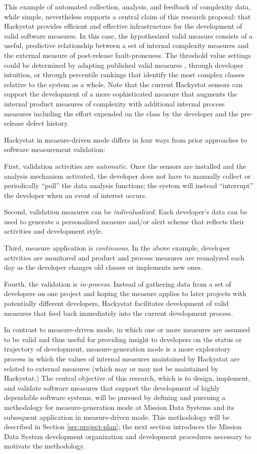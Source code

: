 This example of automated collection, analysis, and feedback of complexity
data, while simple, nevertheless supports a central claim of this research
proposal: that Hackystat provides efficient and effective infrastructure
for the development of valid software measures. In this case, the
hypothesized valid measure consists of a useful, predictive relationship
between a set of internal complexity measures and the external measure of
post-release fault-proneness. The threshold value settings could be
determined by adapting published valid measures \cite{Basili96,Briand01},
through developer intuition, or through percentile rankings that identify
the most complex classes relative to the system as a whole.  Note that the
current Hackystat sensors can support the development of a more
sophisticated measure that augments the internal product measures of
complexity with additional internal process measures including the effort
expended on the class by the developer and the pre-release defect history.

Hackystat in measure-driven mode differs in four ways from 
prior approaches to software measurement validation:

First, validation activities are {\em automatic}. Once the sensors are
installed and the analysis mechanism activated, the developer does not have
to manually collect or periodically ``poll'' the data analysis functions;
the system will instead ``interrupt'' the developer when an event of
interest occurs.

Second, validation measures can be {\em individualized}. Each developer's
data can be used to generate a personalized measure and/or alert scheme
that reflects their activities and development style.

Third, measure application is {\em continuous}. In the above example, 
developer activities are monitored and product and process measures are
reanalyzed each day as the developer changes old classes or implements new
ones.

Fourth, the validation is {\em in-process}.  Instead of gathering data from
a set of developers on one project and hoping the measure applies to later
projects with potentially different developers, Hackystat facilitates
development of valid measures that feed back immediately into the current
development process. 

In contrast to measure-driven mode, in which one or more measures are
assumed to be valid and thus useful for providing insight to developers on
the status or trajectory of development, measure-generation mode is a more
exploratory process in which the values of internal measures maintained by
Hackystat are related to external measures (which may or may not be
maintained by Hackystat.)   The central objective of this research, which is
to design, implement, and validate software measures that support the
development of highly dependable software systems, will be pursued by
defining and pursuing a methodology for measure-generation mode at Mission
Data Systems and its subsequent application in measure-driven
mode. This methodology will be described in Section \ref{sec:project-plan}; 
the next section introduces the Mission Data System development organization and
development procedures necessary to motivate the methodology.

